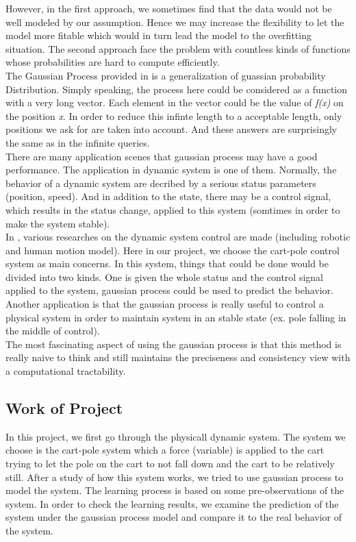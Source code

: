 \documentclass[11pt,twoside,a4paper]{article}
\begin{document}
However, in the first approach, we sometimes find that the data would
not be well modeled by our assumption. Hence we may increase the
flexibility to let the model more fitable which would in turn lead the
model to the overfitting situation. The second approach face the
problem with countless kinds of functions whose probabilities are hard to
compute efficiently.\\

The Gaussian Process provided in \cite{Doob1944} is a generalization
of guassian probability Distribution. Simply speaking, the process
here could be considered as a function with a very long vector. Each
element in the vector could be the value of \textit{f(x)} on the
position \textit{x}. In order to reduce this infinte length to a
acceptable length, only positions we ask for are taken into
account. And these answers are surprisingly the same as in the
infinite queries.\\

There are many application scenes that gaussian process may have a
good performance. The application in dynamic system is one of
them. Normally, the behavior of a dynamic system are decribed by a
serious status parameters (position, speed). And in addition to the
state, there may be a control signal, which results in the status
change, applied to this system (somtimes in order to make the system
stable).\\

In \cite{Kocijan2003, Nguyen-Tuong2008, Azman2008},
various researches on the dynamic system control are made (including robotic
and human motion model). Here in our project, we choose the cart-pole
control system \cite{Brownlee2005} as main concerns. In this system,
things that could be done would be divided into two kinds. One is
given the whole status and the control signal applied to the system,
gaussian process could be used to predict the behavior. Another
application is that the gaussian process is really useful to control
a physical system in order to maintain system in an stable state
(ex. pole falling in the middle of control).\\

The most fascinating aspect of using the gaussian process is that this
method is really naive to think and still maintains the preciseness
and consistency view with a computational tractability.\\

\subsection{Work of Project}
In this project, we first go through the physicall dynamic
system. The system we choose is the cart-pole system which a force (variable) is
applied to the cart trying to let the pole on the cart to not fall down
and the cart to be relatively still. After a study of how this system
works, we tried to use gaussian process to model the system. The
learning process is based on some pre-observations of the system. In
order to check the learning results, we examine the prediction of the
system under the gaussian process model and compare it to the real
behavior of the system.\\
\end{document}
